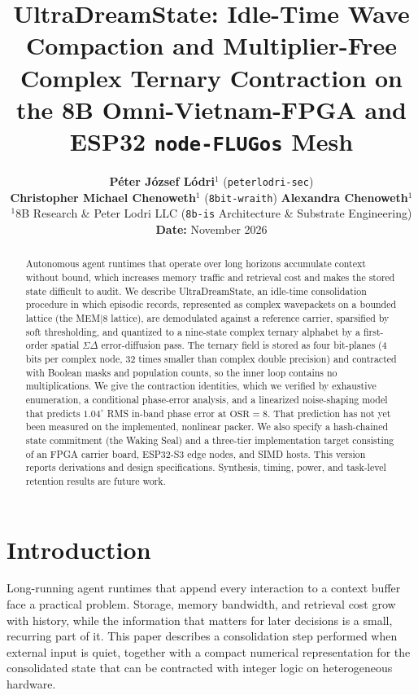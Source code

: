 \documentclass[10pt, twocolumn, a4paper]{article}
\title{\textbf{\Large UltraDreamState: Idle-Time Wave Compaction and Multiplier-Free Complex Ternary Contraction on the 8B Omni-Vietnam-FPGA and ESP32 \texttt{node-FLUGos} Mesh}}
\author{
    \textbf{P\'eter J\'ozsef L\'odri}$^{1}$ (\texttt{peterlodri-sec}) \\[2pt]
    \textbf{Christopher Michael Chenoweth}$^{1}$ (\texttt{8bit-wraith}) \quad
    \textbf{Alexandra Chenoweth}$^{1}$ \\[6pt]
    {\small $^{1}$8B Research \& Peter Lodri LLC (\texttt{8b-is} Architecture \& Substrate Engineering)} \\
    {\small \textbf{Date:} November 2026}
}
\date{}
\begin{document}
\maketitle

\begin{abstract}
\noindent Autonomous agent runtimes that operate over long horizons accumulate context without bound, which increases memory traffic and retrieval cost and makes the stored state difficult to audit. We describe UltraDreamState, an idle-time consolidation procedure in which episodic records, represented as complex wavepackets on a bounded lattice (the MEM|8 lattice), are demodulated against a reference carrier, sparsified by soft thresholding, and quantized to a nine-state complex ternary alphabet by a first-order spatial $\Sigma\Delta$ error-diffusion pass. The ternary field is stored as four bit-planes (4 bits per complex node, 32 times smaller than complex double precision) and contracted with Boolean masks and population counts, so the inner loop contains no multiplications. We give the contraction identities, which we verified by exhaustive enumeration, a conditional phase-error analysis, and a linearized noise-shaping model that predicts $1.04^\circ$ RMS in-band phase error at $\text{OSR}=8$. That prediction has not yet been measured on the implemented, nonlinear packer. We also specify a hash-chained state commitment (the Waking Seal) and a three-tier implementation target consisting of an FPGA carrier board, ESP32-S3 edge nodes, and SIMD hosts. This version reports derivations and design specifications. Synthesis, timing, power, and task-level retention results are future work.
\end{abstract}

\section{Introduction}

Long-running agent runtimes that append every interaction to a context buffer face a practical problem. Storage, memory bandwidth, and retrieval cost grow with history, while the information that matters for later decisions is a small, recurring part of it. This paper describes a consolidation step performed when external input is quiet, together with a compact numerical representation for the consolidated state that can be contracted with integer logic on heterogeneous hardware.
\end{document}
